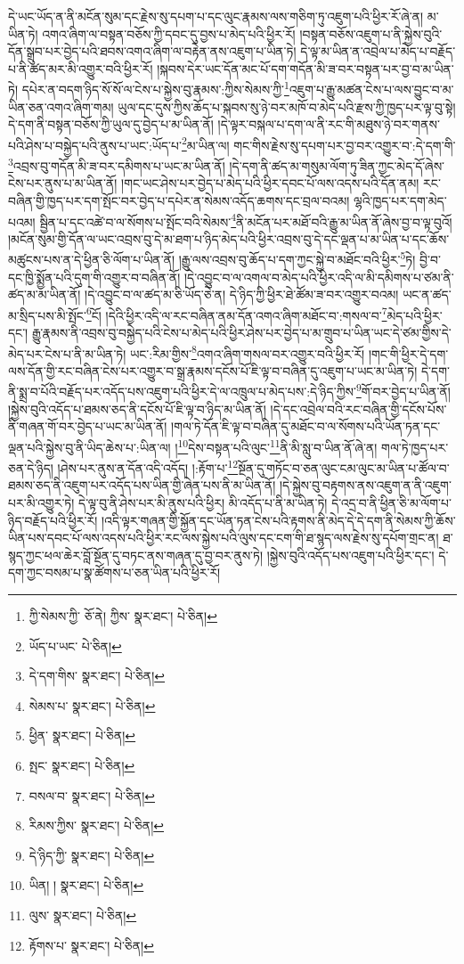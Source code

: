 དེ་ཡང་ཡོད་ན་ནི་མངོན་སུམ་དང་རྗེས་སུ་དཔག་པ་དང་ལུང་རྣམས་ལས་གཅིག་ཏུ་འཇུག་པའི་ཕྱིར་རོ་ཞེ་ན། མ་ཡིན་ཏེ། འགའ་ཞིག་ལ་བསྟན་བཅོས་ཀྱི་དབང་དུ་བྱས་པ་མེད་པའི་ཕྱིར་རོ། །བསྟན་བཅོས་འཇུག་པ་ནི་སྐྱེས་བུའི་དོན་སྒྲུབ་པར་བྱེད་པའི་ཐབས་འགའ་ཞིག་ལ་བརྟེན་ནས་འཇུག་པ་ཡིན་ཏེ། དེ་ལྟ་མ་ཡིན་ན་འབྲེལ་པ་མེད་པ་བརྗོད་པ་ནི་ཚད་མར་མི་འགྱུར་བའི་ཕྱིར་རོ། །སྐབས་དེར་ཡང་དོན་མང་པོ་དག་གདོན་མི་ཟ་བར་བསྟན་པར་བྱ་བ་མ་ཡིན་ཏེ། དཔེར་ན་བདག་ཉིད་སོ་སོ་ལ་ངེས་པ་སྐྱེས་བུ་རྣམས་:ཀྱིས་སེམས་ཀྱི་\footnote{ཀྱི་སེམས་ཀྱི་  ཅོ་ནེ། ཀྱིས་  སྣར་ཐང་།  པེ་ཅིན། }འཇུག་པ་རྒྱུ་མཚན་ངེས་པ་ལས་བྱུང་བ་མ་ཡིན་ཅན་འགའ་ཞིག་གམ། ཡུལ་དང་དུས་ཀྱིས་ཆོད་པ་སྐབས་སུ་ཉེ་བར་མཁོ་བ་མེད་པའི་རྫས་ཀྱི་ཁྱད་པར་ལྟ་བུ་སྟེ། དེ་དག་ནི་བསྟན་བཅོས་ཀྱི་ཡུལ་དུ་བྱེད་པ་མ་ཡིན་ནོ། །དེ་ལྟར་བསྐལ་པ་དག་ལ་ནི་རང་གི་མཐུས་ཉེ་བར་གནས་པའི་ཤེས་པ་བསྐྱེད་པའི་ནུས་པ་ཡང་:ཡོད་པ་\footnote{ཡོད་པ་ཡང་  པེ་ཅིན། }མ་ཡིན་ལ། གང་གིས་རྗེས་སུ་དཔག་པར་བྱ་བར་འགྱུར་བ་:དེ་དག་གི་\footnote{དེ་དག་གིས་  སྣར་ཐང་།  པེ་ཅིན། }འབྲས་བུ་གདོན་མི་ཟ་བར་དམིགས་པ་ཡང་མ་ཡིན་ནོ། །དེ་དག་ནི་ཚད་མ་གསུམ་ལོག་ཏུ་ཟིན་ཀྱང་མེད་དོ་ཞེས་ངེས་པར་ནུས་པ་མ་ཡིན་ནོ། །གང་ཡང་ཤེས་པར་བྱེད་པ་མེད་པའི་ཕྱིར་དབང་པོ་ལས་འདས་པའི་དོན་ནམ། རང་བཞིན་གྱི་ཁྱད་པར་དག་སྤོང་བར་བྱེད་པ་དཔེར་ན་སེམས་འདོད་ཆགས་དང་བྲལ་བའམ། ལྷའི་ཁྱད་པར་དག་མེད་པའམ། སྦྱིན་པ་དང་འཚེ་བ་ལ་སོགས་པ་སྤོང་བའི་སེམས་\footnote{སེམས་པ་  སྣར་ཐང་།  པེ་ཅིན། }ནི་མངོན་པར་མཐོ་བའི་རྒྱུ་མ་ཡིན་ནོ་ཞེས་བྱ་བ་ལྟ་བུའོ། །མངོན་སུམ་གྱི་དོན་ལ་ཡང་འབྲས་བུ་དེ་མ་ཐག་པ་ཉིད་མེད་པའི་ཕྱིར་འབྲས་བུ་དེ་དང་ལྡན་པ་མ་ཡིན་པ་དང་ཆོས་མཚུངས་པས་ན་དེ་ཕྱིན་ཅི་ལོག་པ་ཡིན་ནོ། །རྒྱུ་ལས་འབྲས་བུ་ཆོད་པ་དག་ཀྱང་སྐྱེ་བ་མཐོང་བའི་ཕྱིར་\footnote{ཕྱིན་  སྣར་ཐང་།  པེ་ཅིན། }ཏེ། བྱི་བ་དང་ཁྱི་སྨྱོན་པའི་དུག་གི་འགྱུར་བ་བཞིན་ནོ། །དེ་འབྱུང་བ་ལ་འགལ་བ་མེད་པའི་ཕྱིར་འདི་ལ་མི་དམིགས་པ་ཙམ་ནི་ཚད་མ་མ་ཡིན་ནོ། །དེ་འབྱུང་བ་ལ་ཚད་མ་ཅི་ཡོད་ཅེ་ན། དེ་ཉིད་ཀྱི་ཕྱིར་ཐེ་ཚོམ་ཟ་བར་འགྱུར་བའམ། ཡང་ན་ཚད་མ་སྲིད་པས་མི་སྤོང་\footnote{སྤང་  སྣར་ཐང་།  པེ་ཅིན། }ངོ། །དེའི་ཕྱིར་འདི་ལ་རང་བཞིན་ནམ་དོན་འགའ་ཞིག་མཐོང་བ་:གསལ་བ་\footnote{བསལ་བ་  སྣར་ཐང་།  པེ་ཅིན། }མེད་པའི་ཕྱིར་དང་། རྒྱུ་རྣམས་ནི་འབྲས་བུ་བསྐྱེད་པའི་ངེས་པ་མེད་པའི་ཕྱིར་ཤེས་པར་བྱེད་པ་མ་གྲུབ་པ་ཡིན་ཡང་དེ་ཙམ་གྱིས་དེ་མེད་པར་ངེས་པ་ནི་མ་ཡིན་ཏེ། ཡང་:རིམ་གྱིས་\footnote{རིམས་ཀྱིས་  སྣར་ཐང་།  པེ་ཅིན། }འགའ་ཞིག་གསལ་བར་འགྱུར་བའི་ཕྱིར་རོ། །གང་གི་ཕྱིར་དེ་དག་ལས་དོན་གྱི་རང་བཞིན་ངེས་པར་འགྱུར་བ་སྒྲ་རྣམས་དངོས་པོ་ཇི་ལྟ་བ་བཞིན་དུ་འཇུག་པ་ཡང་མ་ཡིན་ཏེ། དེ་དག་ནི་སྨྲ་བ་པོའི་བརྗོད་པར་འདོད་པས་འཇུག་པའི་ཕྱིར་དེ་ལ་འཁྲུལ་པ་མེད་པས་:དེ་ཉིད་ཀྱིས་\footnote{དེ་ཉིད་ཀྱི་  སྣར་ཐང་།  པེ་ཅིན། }གོ་བར་བྱེད་པ་ཡིན་ནོ། །སྐྱེས་བུའི་འདོད་པ་ཐམས་ཅད་ནི་དངོས་པོ་ཇི་ལྟ་བ་ཉིད་མ་ཡིན་ནོ། །དེ་དང་འབྲེལ་བའི་རང་བཞིན་གྱི་དངོས་པོས་ནི་གཞན་གོ་བར་བྱེད་པ་ཡང་མ་ཡིན་ནོ། །གལ་ཏེ་དོན་ཇི་ལྟ་བ་བཞིན་དུ་མཐོང་བ་ལ་སོགས་པའི་ཡོན་ཏན་དང་ལྡན་པའི་སྐྱེས་བུ་ནི་ཡིད་ཆེས་པ་:ཡིན་ལ། །\footnote{ཡིན། །  སྣར་ཐང་།  པེ་ཅིན། }དེས་བསྟན་པའི་ལུང་\footnote{ལུས་  སྣར་ཐང་།  པེ་ཅིན། }ནི་མི་སླུ་བ་ཡིན་ནོ་ཞེ་ན། གལ་ཏེ་ཁྱད་པར་ཅན་དེ་ཉིད། །ཤེས་པར་ནུས་ན་དོན་འདི་འདོད། །:རྟོག་པ་\footnote{རྟོགས་པ་  སྣར་ཐང་།  པེ་ཅིན། }སྔོན་དུ་གཏོང་བ་ཅན་ལུང་ངམ་ལུང་མ་ཡིན་པ་ཚོལ་བ་ཐམས་ཅད་ནི་འཇུག་པར་འདོད་པས་ཡིན་གྱི་ཞེན་པས་ནི་མ་ཡིན་ནོ། །དེ་སྐྱེས་བུ་བརྟགས་ནས་འཇུག་ན་ནི་འཇུག་པར་མི་འགྱུར་ཏེ། དེ་ལྟ་བུ་ནི་ཤེས་པར་མི་ནུས་པའི་ཕྱིར། མི་འདོད་པ་ནི་མ་ཡིན་ཏེ། དེ་འདྲ་བ་ནི་ཕྱིན་ཅི་མ་ལོག་པ་ཉིད་བརྗོད་པའི་ཕྱིར་རོ། །འདི་ལྟར་གཞན་གྱི་སྐྱོན་དང་ཡོན་ཏན་ངེས་པའི་རྟགས་ནི་མེད་དེ་དེ་དག་ནི་སེམས་ཀྱི་ཆོས་ཡིན་པས་དབང་པོ་ལས་འདས་པའི་ཕྱིར་རང་ལས་སྐྱེས་པའི་ལུས་དང་ངག་གི་ཐ་སྙད་ལས་རྗེས་སུ་དཔོག་གྲང་ན། ཐ་སྙད་ཀྱང་ཕལ་ཆེར་བློ་སྔོན་དུ་བཏང་ནས་གཞན་དུ་བྱ་བར་ནུས་ཏེ། །སྐྱེས་བུའི་འདོད་པས་འཇུག་པའི་ཕྱིར་དང་། དེ་དག་ཀྱང་བསམ་པ་སྣ་ཚོགས་པ་ཅན་ཡིན་པའི་ཕྱིར་རོ། 